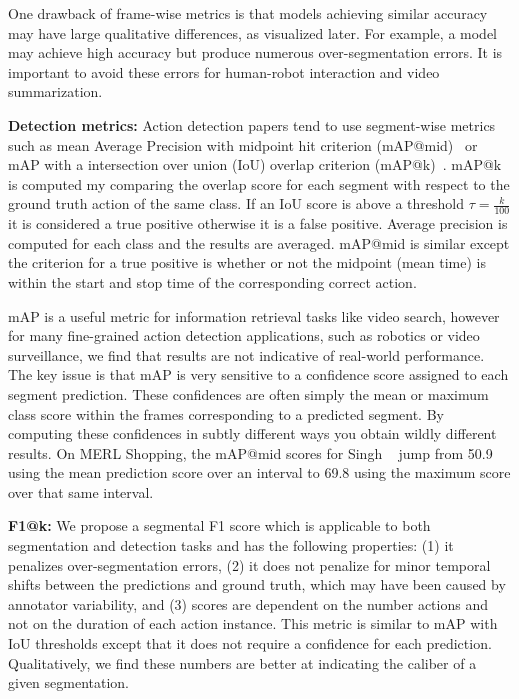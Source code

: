 \documentclass[10pt,twocolumn,letterpaper]{article}
\newcommand{\fakesubsection}[1]{\smallskip\noindent\textbf{#1:}}
\begin{document}
One drawback of frame-wise metrics is that models achieving similar accuracy may have large qualitative differences, as visualized later.
For example, a model may achieve high accuracy but produce numerous over-segmentation errors. It is important to avoid these errors for human-robot interaction and video summarization. 



\fakesubsection{Detection metrics}
Action detection papers tend to use segment-wise metrics such as mean Average Precision with midpoint hit criterion (mAP@mid)~\cite{rohrbach_ijcv_2015,singh_cvpr_2016_merl} or mAP with a intersection over union (IoU) overlap criterion (mAP@k)~\cite{richard_cvpr_2016}. 
mAP@k is computed my comparing the overlap score for each segment with respect to the ground truth action of the same class. If an IoU score is above a threshold $\tau=\frac{k}{100}$ it is considered a true positive otherwise it is a false positive. Average precision is computed for each class and the results are averaged. 
mAP@mid is similar except the criterion for a true positive is whether or not the midpoint (mean time) is within the start and stop time of the corresponding correct action.



mAP is a useful metric for information retrieval tasks like video search, however for many fine-grained action detection applications, such as robotics or video surveillance, we find that results are not indicative of real-world performance. 
The key issue is that mAP is very sensitive to a confidence score assigned to each segment prediction. 
These confidences are often simply the mean or maximum class score within the frames corresponding to a predicted segment.
By computing these confidences in subtly different ways you obtain wildly different results. 
On MERL Shopping, the mAP@mid scores for Singh \etal~\cite{singh_cvpr_2016_merl} jump from 50.9 using the mean prediction score over an interval to 69.8 using the maximum score over that same interval. 













\fakesubsection{F1@k}
We propose a segmental F1 score which is applicable to both segmentation and detection tasks and has the following properties:
(1) it penalizes over-segmentation errors, (2) it does not penalize for minor temporal shifts between the predictions and ground truth, which may have been caused by annotator variability, and (3) scores are dependent on the number actions and not on the duration of each action instance. 
This metric is similar to mAP with IoU thresholds except that it does not require a confidence for each prediction. 
Qualitatively, we find these numbers are better at indicating the caliber of a given segmentation. 
\end{document}
